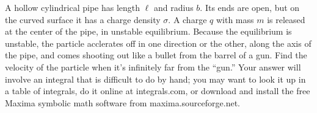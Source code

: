 A hollow cylindrical pipe has length $\ell$ and radius $b$. Its ends are open, but on the curved
surface it has a charge density $\sigma$. A charge $q$ with mass $m$ is released at the center
of the pipe, in unstable equilibrium. Because the equilibrium is unstable, the particle acclerates
off in one direction or the other, along the axis of the pipe, and comes shooting out like a bullet
from the barrel of a gun. Find the velocity of the particle when it's infinitely far from the ``gun.''
Your answer will involve an integral that is difficult to do by hand;
you may want to look it up in a table of integrals, do it online at
integrals.com, or download and install the free Maxima symbolic math
software from maxima.sourceforge.net.
